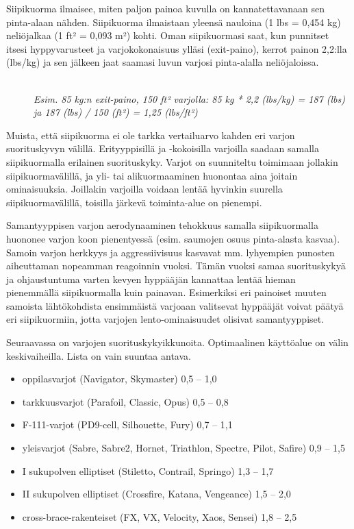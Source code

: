 
Siipikuorma ilmaisee, miten paljon painoa kuvulla on kannatettavanaan sen pinta-alaan nähden. Siipikuorma ilmaistaan yleensä nauloina (1 lbs = 0,454 kg) neliöjalkaa (1 ft² = 0,093 m²) kohti. Oman siipikuormasi saat, kun punnitset itsesi hyppyvarusteet ja varjokokonaisuus ylläsi (exit-paino), kerrot painon 2,2:lla (lbs/kg) ja sen jälkeen jaat saamasi luvun varjosi pinta-alalla neliöjaloissa.  

\begin{description}
\item[ ] \hfill \\ 
\textit{Esim. 85 kg:n exit-paino, 150 ft² varjolla: 85 kg * 2,2 (lbs/kg) = 187 (lbs) ja 187 (lbs) / 150 (ft²) = 1,25 (lbs/ft²)} \hfill \\ 
\end{description}

Muista, että siipikuorma ei ole tarkka vertailuarvo kahden eri varjon suorituskyvyn välillä. Erityyppisillä ja -kokoisilla varjoilla saadaan samalla siipikuormalla erilainen suorituskyky. Varjot on suunniteltu toimimaan jollakin siipikuormavälillä, ja yli- tai alikuormaaminen huonontaa aina joitain ominaisuuksia. Joillakin varjoilla voidaan lentää hyvinkin suurella siipikuormavälillä, toisilla järkevä toiminta-alue on pienempi. 


Samantyyppisen varjon aerodynaaminen tehokkuus samalla siipikuormalla huononee varjon koon pienentyessä (esim. saumojen osuus pinta-alasta kasvaa). Samoin varjon herkkyys ja aggressiivisuus kasvavat mm. lyhyempien punosten aiheuttaman nopeamman reagoinnin vuoksi. Tämän vuoksi samaa suorituskykyä ja ohjaustuntuma varten kevyen hyppääjän kannattaa lentää hieman pienemmällä siipikuormalla kuin painavan. Esimerkiksi eri painoiset muuten samoista lähtökohdista ensimmäistä varjoaan valitsevat hyppääjät voivat päätyä eri siipikuormiin, jotta varjojen lento-ominaisuudet olisivat samantyyppiset. 


Seuraavassa on varjojen suorituskykyikkunoita. Optimaalinen käyttöalue on välin keskivaiheilla. Lista on vain suuntaa antava. 

\begin{itemize}
\item  oppilasvarjot (Navigator, Skymaster)  0,5 – 1,0 
\item  tarkkuusvarjot (Parafoil, Classic, Opus) 0,5 – 0,8 
\item  F-111-varjot (PD9-cell, Silhouette, Fury) 0,7 – 1,1  
\item  yleisvarjot (Sabre, Sabre2, Hornet, Triathlon, Spectre, Pilot, Safire) 0,9 – 1,5 
\item  I sukupolven elliptiset (Stiletto, Contrail, Springo) 1,3 – 1,7 
\item  II sukupolven elliptiset (Crossfire, Katana, Vengeance)  1,5 – 2,0 
\item  cross-brace-rakenteiset (FX, VX, Velocity, Xaos, Sensei) 1,8 – 2,5 
\end{itemize}

